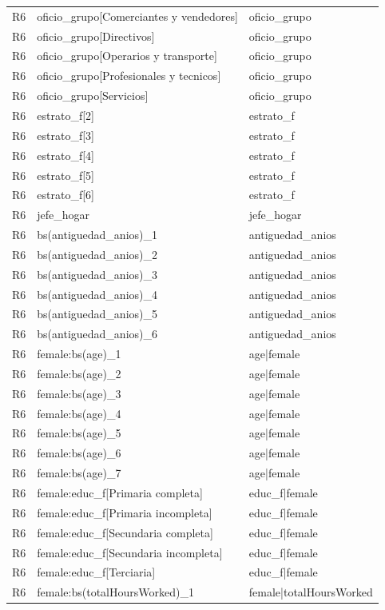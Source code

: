 \begin{longtable}{lll}
R6 & oficio\_grupo[Comerciantes y vendedores] & oficio\_grupo \\
R6 & oficio\_grupo[Directivos] & oficio\_grupo \\
R6 & oficio\_grupo[Operarios y transporte] & oficio\_grupo \\
R6 & oficio\_grupo[Profesionales y tecnicos] & oficio\_grupo \\
R6 & oficio\_grupo[Servicios] & oficio\_grupo \\
R6 & estrato\_f[2] & estrato\_f \\
R6 & estrato\_f[3] & estrato\_f \\
R6 & estrato\_f[4] & estrato\_f \\
R6 & estrato\_f[5] & estrato\_f \\
R6 & estrato\_f[6] & estrato\_f \\
R6 & jefe\_hogar & jefe\_hogar \\
R6 & bs(antiguedad\_anios)\_1 & antiguedad\_anios \\
R6 & bs(antiguedad\_anios)\_2 & antiguedad\_anios \\
R6 & bs(antiguedad\_anios)\_3 & antiguedad\_anios \\
R6 & bs(antiguedad\_anios)\_4 & antiguedad\_anios \\
R6 & bs(antiguedad\_anios)\_5 & antiguedad\_anios \\
R6 & bs(antiguedad\_anios)\_6 & antiguedad\_anios \\
R6 & female:bs(age)\_1 & age|female \\
R6 & female:bs(age)\_2 & age|female \\
R6 & female:bs(age)\_3 & age|female \\
R6 & female:bs(age)\_4 & age|female \\
R6 & female:bs(age)\_5 & age|female \\
R6 & female:bs(age)\_6 & age|female \\
R6 & female:bs(age)\_7 & age|female \\
R6 & female:educ\_f[Primaria completa] & educ\_f|female \\
R6 & female:educ\_f[Primaria incompleta] & educ\_f|female \\
R6 & female:educ\_f[Secundaria completa] & educ\_f|female \\
R6 & female:educ\_f[Secundaria incompleta] & educ\_f|female \\
R6 & female:educ\_f[Terciaria] & educ\_f|female \\
R6 & female:bs(totalHoursWorked)\_1 & female|totalHoursWorked \\

\end{longtable}
